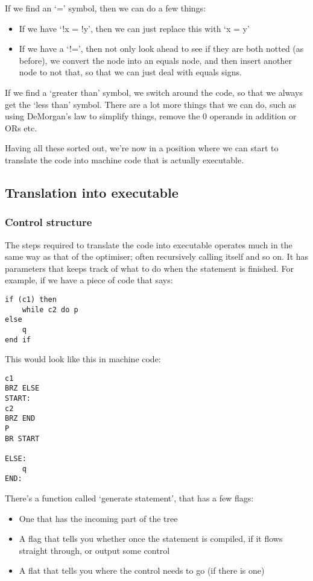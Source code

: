 \documentclass[11pt,a4paper,titlepage,dvipsnames,cmyk]{scrartcl}
\begin{document}
If we find an `=' symbol, then we can do a few things:
\begin{itemize}
    \item If we have `!x = !y', then we can just replace this with `x = y'
    \item If we have a `!=', then not only look ahead to see if they are
        both notted (as before), we convert the node into an equals node,
        and then insert another node to not that, so that we can just deal
        with equals signs.
\end{itemize}

If we find a `greater than' symbol, we switch around the code, so that we
always get the `less than' symbol. There are a lot more things that we can
do, such as using DeMorgan's law to simplify things, remove the 0 operands
in addition or ORs etc.

Having all these sorted out, we're now in a position where we can start to
translate the code into machine code that is actually executable.

\subsection{Translation into executable}%
\label{sub:executable}

\subsubsection{Control structure}%
\label{ssub:control}

The steps required to translate the code into executable operates much in
the same way as that of the optimiser; often recursively calling itself
and so on. It has parameters that keeps track of what to do when the
statement is finished. For example, if we have a piece of code that says:
\begin{lstlisting}[]
if (c1) then
    while c2 do p
else
    q
end if
\end{lstlisting}

This would look like this in machine code:

\begin{lstlisting}[]
c1
BRZ ELSE
START:
c2
BRZ END
P
BR START

ELSE:
    q
END:
\end{lstlisting}

There's a function called `generate statement', that has a few flags:
\begin{itemize}
    \item One that has the incoming part of the tree
    \item A flag that tells you whether once the statement is compiled, if
        it flows straight through, or output some control
    \item A flat that tells you where the control needs to go (if there is
        one)
\end{itemize}
\end{document}
